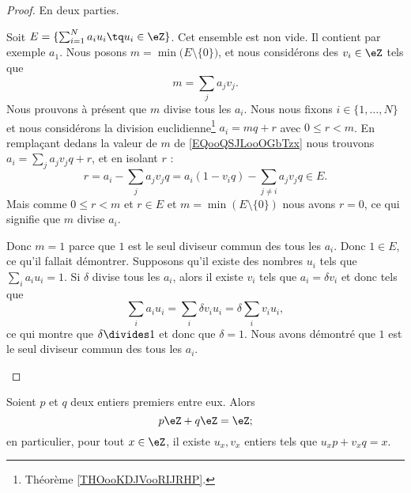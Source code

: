 \begin{proof}
	En deux parties.
	\begin{subproof}
		\spitem[\( \Rightarrow\)]
		Soit \( E=\{ \sum_{i=1}^Na_iu_i\tq u_i\in \eZ \}\). Cet ensemble est non vide. Il contient par exemple \( a_1\). Nous posons \( m=\min\big( E\setminus\{ 0 \} \big)\), et nous considérons des \( v_i\in \eZ\) tels que
		\begin{equation}		\label{EQooQSJLooOGbTzx}
			m=\sum_ja_jv_j.
		\end{equation}
		Nous prouvons à présent que \( m\) divise tous les \( a_i\). Nous nous fixons \( i\in\{ 1,\ldots,N \}\) et nous considérons la division euclidienne\footnote{Théorème \ref{THOooKDJVooRIJRHP}.} \( a_i=mq+r\) avec \( 0\leq r<m\). En remplaçant dedans la valeur de \( m\) de \eqref{EQooQSJLooOGbTzx} nous trouvons \( a_i=\sum_ja_jv_jq+r\), et en isolant \( r\) :
		\begin{equation}
			r=a_i-\sum_{j}a_jv_jq=a_i(1-v_iq)-\sum_{j\neq i}a_jv_jq\in E.
		\end{equation}
		Mais comme \( 0\leq r<m\) et \( r\in E\) et \( m=\min(E\setminus\{ 0 \})\) nous avons \( r=0\), ce qui signifie que \( m\) divise \( a_i\).

		Donc \( m=1\) parce que \( 1\) est le seul diviseur commun des tous les \( a_i\). Donc \( 1\in E\), ce qu'il fallait démontrer.
		\spitem[\( \Leftarrow\)]
		Supposons qu'il existe des nombres \( u_i\) tels que \( \sum_ia_iu_i=1\). Si \( \delta\) divise tous les \( a_i\), alors il existe \( v_i\) tels que \( a_i=\delta v_i\) et donc tels que
		\begin{equation}
			\sum_ia_iu_i=\sum_i\delta v_iu_i=\delta\sum_iv_iu_i,
		\end{equation}
		ce qui montre que \( \delta\divides 1\) et donc que \( \delta=1\). Nous avons démontré que \( 1\) est le seul diviseur commun des tous les \( a_i\).
	\end{subproof}
\end{proof}

\begin{corollary}       \label{CorgEMtLj}
	Soient \( p\) et \( q\) deux entiers premiers entre eux. Alors
	\begin{equation}
		p\eZ+q\eZ=\eZ;
	\end{equation}
	en particulier, pour tout \( x \in \eZ \), il existe \( u_x, v_x \) entiers tels que \(u_x p + v_x q = x \).
\end{corollary}

